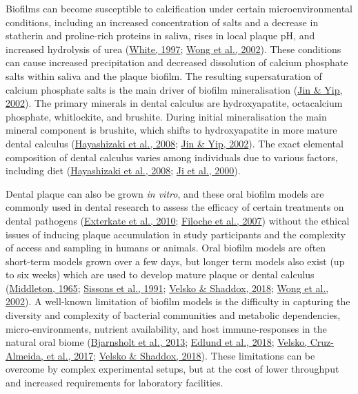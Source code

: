 \documentclass[
  b5paper,
]{book}
\begin{document}
Biofilms can become susceptible to calcification under certain
microenvironmental conditions, including an increased concentration of
salts and a decrease in statherin and proline-rich proteins in saliva,
rises in local plaque pH, and increased hydrolysis of urea
(\protect\hyperlink{ref-whiteDentalCalculus1997}{White, 1997};
\protect\hyperlink{ref-wongCalciumPhosphate2002}{Wong et al., 2002}).
These conditions can cause increased precipitation and decreased
dissolution of calcium phosphate salts within saliva and the plaque
biofilm. The resulting supersaturation of calcium phosphate salts is the
main driver of biofilm mineralisation
(\protect\hyperlink{ref-jinSupragingivalCalculus2002}{Jin \& Yip,
2002}). The primary minerals in dental calculus are hydroxyapatite,
octacalcium phosphate, whitlockite, and brushite. During initial
mineralisation the main mineral component is brushite, which shifts to
hydroxyapatite in more mature dental calculus
(\protect\hyperlink{ref-hayashizakiSiteSpecific2008}{Hayashizaki et al.,
2008}; \protect\hyperlink{ref-jinSupragingivalCalculus2002}{Jin \& Yip,
2002}). The exact elemental composition of dental calculus varies among
individuals due to various factors, including diet
(\protect\hyperlink{ref-hayashizakiSiteSpecific2008}{Hayashizaki et al.,
2008}; \protect\hyperlink{ref-jiFluorideMagnesium2000}{Ji et al.,
2000}).

Dental plaque can also be grown \emph{in vitro}, and these oral biofilm
models are commonly used in dental research to assess the efficacy of
certain treatments on dental pathogens
(\protect\hyperlink{ref-extercateAAA2010}{Exterkate et al., 2010};
\protect\hyperlink{ref-filochePlaqueMicrocosm2007}{Filoche et al.,
2007}) without the ethical issues of inducing plaque accumulation in
study participants and the complexity of access and sampling in humans
or animals. Oral biofilm models are often short-term models grown over a
few days, but longer term models also exist (up to six weeks) which are
used to develop mature plaque or dental calculus
(\protect\hyperlink{ref-middletonVitroCalculus1965}{Middleton, 1965};
\protect\hyperlink{ref-sissonsMultistationPlaque1991}{Sissons et al.,
1991}; \protect\hyperlink{ref-velskoConsistentReproducible2018}{Velsko
\& Shaddox, 2018}; \protect\hyperlink{ref-wongCalciumPhosphate2002}{Wong
et al., 2002}). A well-known limitation of biofilm models is the
difficulty in capturing the diversity and complexity of bacterial
communities and metabolic dependencies, micro-environments, nutrient
availability, and host immune-responses in the natural oral biome
(\protect\hyperlink{ref-bjarnsholtVivoBiofilm2013}{Bjarnsholt et al.,
2013}; \protect\hyperlink{ref-edlundUncoveringComplex2018}{Edlund et
al., 2018}; \protect\hyperlink{ref-velskoCytokineResponse2017}{Velsko,
Cruz-Almeida, et al., 2017};
\protect\hyperlink{ref-velskoConsistentReproducible2018}{Velsko \&
Shaddox, 2018}). These limitations can be overcome by complex
experimental setups, but at the cost of lower throughput and increased
requirements for laboratory facilities.
\end{document}
